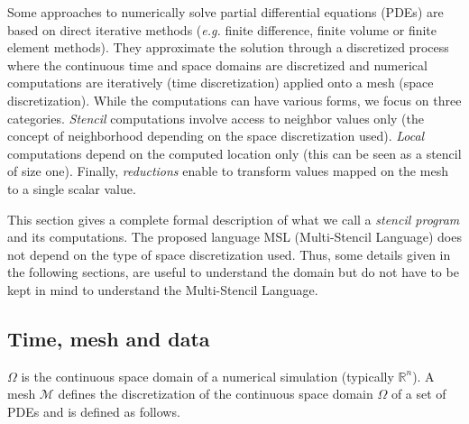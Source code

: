 
Some approaches to numerically solve partial differential equations (PDEs) are based on direct iterative methods (\textit{e.g.} finite difference, finite volume or finite element methods).
They approximate the solution through a discretized process where the continuous time and space domains are discretized and numerical computations are iteratively (time discretization) applied onto a mesh (space discretization).
While the computations can have various forms, we focus on three categories.
\emph{Stencil} computations involve access to neighbor values only (the concept of neighborhood depending on the space discretization used).
\emph{Local} computations depend on the computed location only (this can be seen as a stencil of size one).
Finally, \emph{reductions} enable to transform values mapped on the mesh to a single scalar value.

This section gives a complete formal description of what we call a \textit{stencil program} and its computations.
The proposed language MSL (Multi-Stencil Language) does not depend on the type of space discretization used.
Thus, some details given in the following sections, are useful to understand the domain but do not have to be kept in mind to understand the Multi-Stencil Language.

\subsection{Time, mesh and data}

$\Omega$ is the continuous space domain of a numerical simulation (typically $\mathbb{R}^n$). %
A mesh $\mathcal{M}$ defines the discretization of the continuous space domain $\Omega$ of a set of PDEs and is defined as follows.

